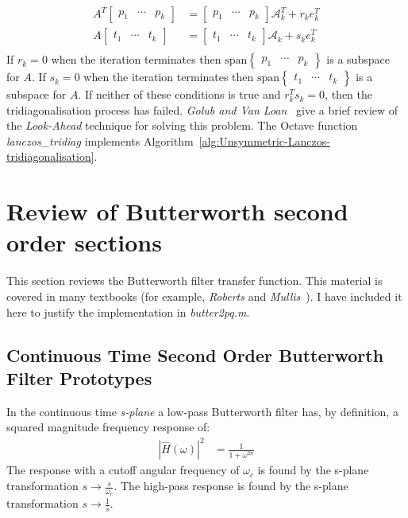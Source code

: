\documentclass[a4paper,twoside,10pt,english]{report}
\begin{document}
\begin{align*}
A^{T}\left[\begin{array}{ccc} p_{1} & \cdots & p_{k}\end{array}\right] &=
\left[\begin{array}{ccc} p_{1}&\cdots&p_{k}\end{array}\right]\mathcal{A}^{T}_{k}
+r_{k}e_{k}^{T}\\
A\left[\begin{array}{ccc} t_{1} & \cdots & t_{k}\end{array}\right] &=
\left[\begin{array}{ccc} t_{1} & \cdots & t_{k}\end{array}\right]\mathcal{A}_{k}
+s_{k}e_{k}^{T}\\
\end{align*}
If $r_{k}=0$ when the iteration terminates then
$\text{span}\left\{\begin{array}{ccc}p_{1} & \cdots & p_{k}\end{array}\right\}$
is a subspace for $A$. If $s_{k}=0$ when the iteration terminates then
$\text{span}\left\{\begin{array}{ccc}t_{1} & \cdots & t_{k}\end{array}\right\}$
is a subspace for $A$. If neither of these conditions is true and 
$r^{T}_{k}s_{k}=0$, then the tridiagonalisation process has failed. \emph{Golub
and Van Loan}~\cite[Section 9.4.4]{GolubVanLoan_MatrixComputations}
give a brief review of the \emph{Look-Ahead} technique for solving this 
problem. The Octave function \emph{lanczos\_tridiag} implements 
Algorithm~\ref{alg:Unsymmetric-Lanczos-tridiagonalisation}.
\cleardoublepage
\chapter{Review of Butterworth second order sections}
This section reviews the Butterworth filter transfer function. This material is
covered in many textbooks (for example, \emph{Roberts} and
\emph{Mullis}~\cite[Chapter 6]{RobertsMullis_DigitalSignalProcessing}). I have
included it here to justify the implementation in \emph{butter2pq.m}.

\section{Continuous Time Second Order Butterworth Filter Prototypes}
In the continuous time \emph{s-plane} a low-pass Butterworth filter 
has, by definition, a squared magnitude frequency response of:
\begin{align*}
\left|\hat{H}\left(\omega\right)\right|^{2}&=\frac{1}{1+\omega^{2n}}
\end{align*}
The response with a cutoff angular frequency of $\omega_{c}$ is found by the
s-plane transformation $s\rightarrow\frac{s}{\omega_{c}}$. The high-pass
response is found by the s-plane transformation $s\rightarrow\frac{1}{s}$.
\end{document}
